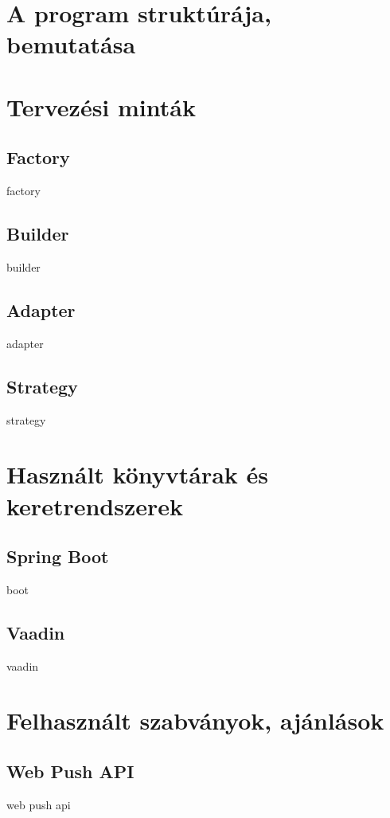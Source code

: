 \section{A program struktúrája, bemutatása}

\section{Tervezési minták}

\subsection{Factory}

factory

\subsection{Builder}

builder

\subsection{Adapter}

adapter

\subsection{Strategy}

strategy

\section{Használt könyvtárak és keretrendszerek}



\subsection{Spring Boot}

boot



\subsection{Vaadin}

vaadin

\section{Felhasznált szabványok, ajánlások}








\subsection{Web Push API}

web push api